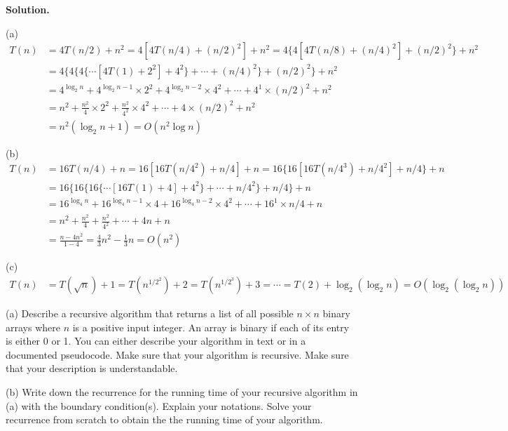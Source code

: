 \documentclass[10pt]{article}
\begin{document}
\textbf{Solution.}

(a)
$$
\begin{aligned}
	T(n) &= 4T(n/2) + n^2 = 4[4T(n/4) + (n/2)^2] + n^2 = 4\{4[4T(n/8) + (n/4)^2] + (n/2)^2\} + n^2\\
	&= 4\{4\{4\{\cdots [4T(1) + 2^2] + 4^2\} + \cdots + (n/4)^2\} + (n/2)^2\} + n^2\\
	&= 4^{\log_2 n} + 4^{\log_2 n - 1} \times 2^2 + 4^{\log_2 n - 2} \times 4^2 + \cdots + 4^{1} \times (n/2)^2 + n^2\\
	&= n^2 + \frac{n^2}{4} \times 2^2 + \frac{n^2}{4^2} \times 4^2 + \cdots + 4 \times (n/2)^2 + n^2\\
	&= n^2 (\log_2 n + 1) = O(n^2\log n)
\end{aligned}
$$

(b)
$$
\begin{aligned}
	T(n) &= 16T(n/4) + n = 16[16T(n/4^2) + n/4] + n = 16\{16[16T(n/4^3) + n/4^2] + n/4\} + n\\
	&= 16\{16\{16\{\cdots [16T(1) + 4] + 4^2\} + \cdots + n/4^2\} + n/4\} + n\\
	&= 16^{\log_4 n} + 16^{\log_4 n - 1} \times 4 + 16^{\log_4 n - 2} \times 4^2 + \cdots + 16^{1} \times n/4 + n\\
	&= n^2 + \frac{n^2}{4} + \frac{n^2}{4^2} + \cdots + 4n + n\\
	&= \frac{n-4n^2}{1-4} = \frac{4}{3} n^2 -\frac{1}{3} n = O(n^2)
\end{aligned}
$$

(c)
$$
\begin{aligned}
	T(n) &= T(\sqrt{n}) + 1 = T(n^{1/2^2}) + 2 = T(n^{1/2^3}) + 3 = \cdots = T(2) + \log_2 (\log_2 n) = O(\log_2 (\log_2 n))
\end{aligned}
$$

\newpage

\begin{Problem}
	
	\noindent (a) Describe a recursive algorithm that returns a list of all possible $n\times n$ binary arrays where $n$ is a positive input integer. An array is binary if each of its entry is either 0 or 1. You can either describe your algorithm in text or in a documented pseudocode. Make sure that your algorithm is recursive. Make sure that your description is understandable.
	
	\noindent (b) Write down the recurrence for the running time of your
	recursive algorithm in (a) with the boundary condition(s). Explain your notations. Solve your recurrence from scratch to obtain the
	the running time of your algorithm.
	
\end{Problem}
\end{document}
